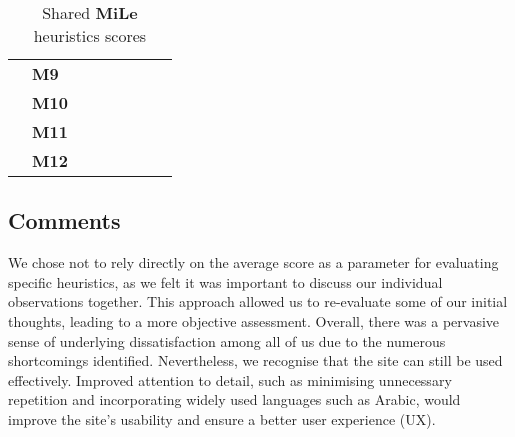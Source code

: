 \begin{table}[htp!]
\begin{tabular}{ |c|l|c|c|c|c|c|c| }
        \cline{2-8}
        & \textbf{M9} & \textbf{\color{unicefGreen}{4}} & \textbf{\color{unicefGreen}{4}} & \textbf{\color{unicefGreen}{4.5}} & \textbf{\color{unicefGreen}{5}} & \textbf{\color{unicefGreen}{4.375}} & \textbf{\color{unicefGreen}{4.5}}\\
        \cline{2-8}
        & \textbf{M10} & \textbf{\color{unicefGreen}{4}} & \textbf{\color{unicefOrange}{3}} & \textbf{\color{unicefGreen}{4.5}} & \textbf{\color{unicefGreen}{4}} & \textbf{\color{unicefOrange}{3.875}} & \textbf{\color{unicefGreen}{4}}\\
        \cline{2-8}
        & \textbf{M11} & \textbf{\color{unicefGreen}{4}} & \textbf{\color{unicefGreen}{4}} & \textbf{\color{unicefGreen}{4}} & \textbf{\color{unicefGreen}{4}} & \textbf{\color{unicefGreen}{4}} & \textbf{\color{unicefGreen}{4}}\\
        \cline{2-8}
        & \textbf{M12} & \textbf{\color{unicefGreen}{5}} & \textbf{\color{unicefGreen}{5}} & \textbf{\color{unicefGreen}{5}} & \textbf{\color{unicefGreen}{5}} & \textbf{\color{unicefGreen}{5}} & \textbf{\color{unicefGreen}{5}}\\
        \hline
    \end{tabular}
    \caption{Shared \textbf{MiLe} heuristics scores}
\end{table}
\newpage
\subsection{Comments}
We chose not to rely directly on the average score as a parameter for evaluating specific heuristics, as we felt it was important to discuss our individual observations together. 
This approach allowed us to re-evaluate some of our initial thoughts, leading to a more objective assessment. 
Overall, there was a pervasive sense of underlying dissatisfaction among all of us due to the numerous shortcomings identified. 
Nevertheless, we recognise that the site can still be used effectively. 
Improved attention to detail, such as minimising unnecessary repetition and incorporating widely used languages such as Arabic, would improve the site's usability and ensure a better user experience (UX).